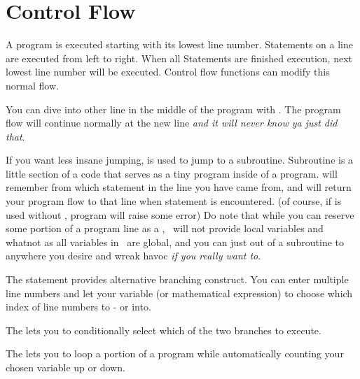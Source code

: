 \section{Control Flow}

A program is executed starting with its lowest line number. Statements on a line are executed from left to right. When all Statements are finished execution, next lowest line number will be executed. Control flow functions can modify this normal flow.

You can dive into other line in the middle of the program with . The program flow will continue normally at the new line \emph{and it will never know ya just did that}.

If you want less insane jumping,  is used to jump to a subroutine. Subroutine is a little section of a code that serves as a tiny program inside of a program.  will remember from which statement in the line you have came from, and will return your program flow to that line when  statement is encountered. (of course, if  is used without , program will raise some error) Do note that while you can reserve some portion of a program line as a , \tbas\ will not provide local variables and whatnot as all variables in \tbas\ are global, and you can just  out of a subroutine to anywhere you desire and wreak havoc \emph{if you really want to}.

The  statement provides alternative branching construct. You can enter multiple line numbers and let your variable (or mathematical expression) to choose which index of line numbers to - or  into.

The  lets you to conditionally select which of the two branches to execute.

The  lets you to loop a portion of a program while automatically counting your chosen variable up or down.
